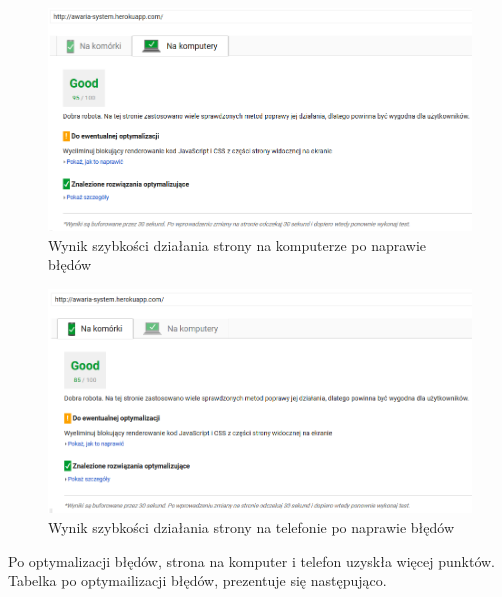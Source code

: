 \documentclass[openright]{xmgr}
\begin{document}
	
	\begin{figure}[!tbh]
		\centering
		\includegraphics[width=\linewidth]{image/wynik2}
		\caption{Wynik szybkości działania strony na komputerze po naprawie błędów}
	\end{figure}
	
	\begin{figure}[!tbh]
		\centering
		\includegraphics[width=\linewidth]{image/wynik1}
		\caption{Wynik szybkości działania strony na telefonie po naprawie błędów}
	\end{figure}
	\newpage
	
	Po optymalizacji błędów, strona na komputer i telefon uzyskła więcej punktów. Tabelka po optymailizacji błędów, prezentuje się następująco. 
	
\end{document}
